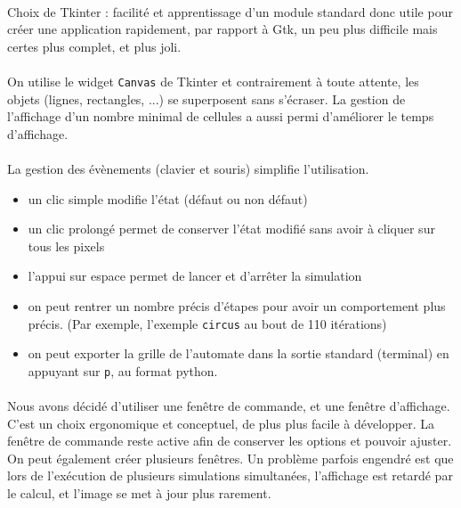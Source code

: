 \documentclass[a4paper]{article}
\begin{document}
\paragraph{} Choix de Tkinter : facilité et apprentissage d'un module standard donc utile pour créer une application rapidement, par rapport à Gtk, un peu plus difficile mais certes plus complet, et plus joli.

\paragraph{} On utilise le widget {\tt Canvas} de Tkinter et contrairement à toute attente, les objets (lignes, rectangles, ...) se superposent sans s'écraser. La gestion de l'affichage d'un nombre minimal de cellules a aussi permi d'améliorer le temps d'affichage.

\paragraph{} La gestion des évènements (clavier et souris) simplifie l'utilisation.

\begin{itemize}
\item{un clic simple modifie l'état (défaut ou non défaut)}
\item{un clic prolongé permet de conserver l'état modifié sans avoir à cliquer sur tous les pixels}
\item{l'appui sur espace permet de lancer et d'arrêter la simulation}
\item{on peut rentrer un nombre précis d'étapes pour avoir un comportement plus précis. (Par exemple, l'exemple {\tt circus} au bout de 110 itérations)}
\item{on peut exporter la grille de l'automate dans la sortie standard (terminal) en appuyant sur {\tt p}, au format python.}
\end{itemize}

\paragraph{} Nous avons décidé d'utiliser une fenêtre de commande, et une fenêtre d'affichage. C'est un choix ergonomique et conceptuel, de plus plus facile à développer. La fenêtre de commande reste active afin de conserver les options et pouvoir ajuster. On peut également créer plusieurs fenêtres. Un problème parfois engendré est que lors de l'exécution de plusieurs simulations simultanées, l'affichage est retardé par le calcul, et l'image se met à jour plus rarement.
\end{document}
